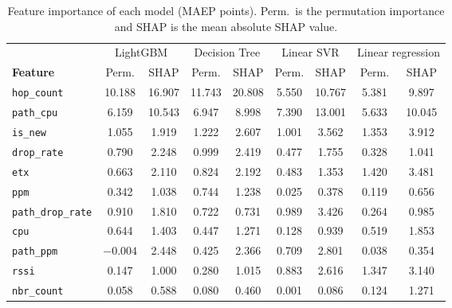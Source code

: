 \begin{table}[htbp]
    \centering
    \small
    \caption{Feature importance of each model (MAEP points). Perm.\ is
        the permutation importance and SHAP is the mean absolute SHAP
    value.}
    \label{tab:fi_all}
    \begin{tabular}{l|cc|cc|cc|cc}
        \hline
        & \multicolumn{2}{c|}{LightGBM}
        & \multicolumn{2}{c|}{Decision Tree}
        & \multicolumn{2}{c|}{Linear SVR}
        & \multicolumn{2}{c}{Linear regression} \\
        \textbf{Feature}
        & Perm. & SHAP & Perm. & SHAP & Perm. & SHAP & Perm. & SHAP \\
        \hline
        \texttt{hop\_count}       & 10.188   & 16.907 & 11.743 & 20.808 &
        5.550 & 10.767 & 5.381 &  9.897 \\
        \texttt{path\_cpu}        &  6.159   & 10.543 &  6.947 &  8.998 &
        7.390 & 13.001 & 5.633 & 10.045 \\
        \texttt{is\_new}          &  1.055   &  1.919 &  1.222 &  2.607 &
        1.001 &  3.562 & 1.353 &  3.912 \\
        \texttt{drop\_rate}       &  0.790   &  2.248 &  0.999 &  2.419 &
        0.477 &  1.755 & 0.328 &  1.041 \\
        \texttt{etx}              &  0.663   &  2.110 &  0.824 &  2.192 &
        0.483 &  1.353 & 1.420 &  3.481 \\
        \texttt{ppm}              &  0.342   &  1.038 &  0.744 &  1.238 &
        0.025 &  0.378 & 0.119 &  0.656 \\
        \texttt{path\_drop\_rate} &  0.910   &  1.810 &  0.722 &  0.731 &
        0.989 &  3.426 & 0.264 &  0.985 \\
        \texttt{cpu}              &  0.644   &  1.403 &  0.447 &  1.271 &
        0.128 &  0.939 & 0.519 &  1.853 \\
        \texttt{path\_ppm}        & $-0.004$ &  2.448 &  0.425 &  2.366 &
        0.709 &  2.801 & 0.038 &  0.354 \\
        \texttt{rssi}             &  0.147   &  1.000 &  0.280 &  1.015 &
        0.883 &  2.616 & 1.347 &  3.140 \\
        \texttt{nbr\_count}       &  0.058   &  0.588 &  0.080 &  0.460 &
        0.001 &  0.086 & 0.124 &  1.271 \\
        \hline
    \end{tabular}
\end{table}

